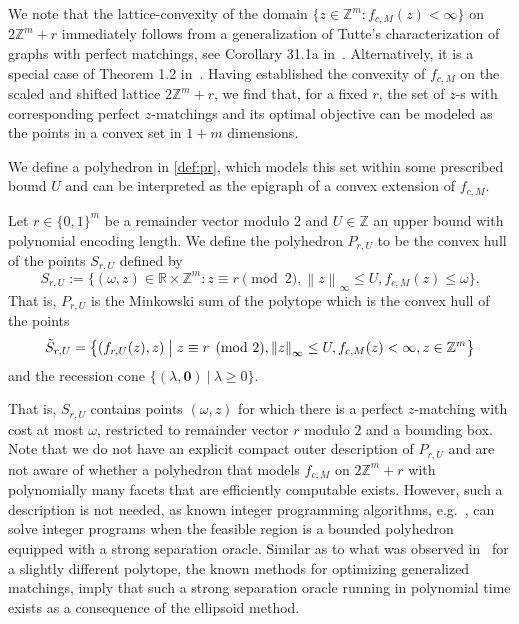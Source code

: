 \documentclass[a4paper,UKenglish,cleveref,thm-restate]{lipics-v2021}
\newcommand{\R}{\mathbb R}
\newcommand{\Z}{\mathbb Z}
\newcommand{\veczero}{\mathbf0}
\begin{document}
{We note that the lattice-convexity of the domain $\{z\in\Z^m\colon f_{c,M}(z)<\infty\}$ on $2\Z^m+r$ immediately follows from a generalization of Tutte's characterization of graphs with perfect matchings, see Corollary 31.1a in~\cite{schrijver2003combinatorial}. Alternatively, it is a special case of Theorem 1.2 in~\cite{DBLP:journals/jgt/AnsteeN99}. 
Having established the convexity of $f_{c,M}$ on the scaled and shifted lattice $2\Z^m+r$, we find that, for a fixed $r$, the set of $z$-s with corresponding perfect $z$-matchings and its optimal objective can be modeled as the points in a convex set in $1+m$ dimensions. 

}

We define a polyhedron in \cref{def:pr}, which models this set within some prescribed bound $U$ and can be interpreted as the epigraph of a convex extension of $f_{c,M}$.

\begin{definition}
    Let $r\in\{0,1\}^m$ be a remainder vector modulo $2$ and $U\in\Z$ an upper bound with polynomial encoding length. We define the polyhedron $P_{r,U}$ to be the convex hull of the points $S_{r,U}$ defined by
    \[
        S_{r,U}:=\bigl\{(\omega,z)\in\R\times\Z^m\colon z\equiv r\pmod2,\left\|z\right\|_\infty\le U,f_{c,M}(z)\le\omega\bigr\}.
    \]
    That is, $P_{r,U}$ is the Minkowski sum of the polytope which is the convex hull of the points
    \[
        \tilde S_{r,U}=\bigl\{(f_{r,U}(z),z)\bigm\vert z\equiv r\pmod2,\left\|z\right\|_\infty\le U,f_{c,M}(z)<\infty,z\in\Z^m\bigr\}
    \]
    and the recession cone $\{(\lambda,\veczero)\ \vert\ \lambda\ge0\}$.
    \label{def:pr}
\end{definition}

That is, $S_{r,U}$ contains points $(\omega,z)$ for which there is a perfect $z$-matching with cost at most $\omega$, restricted to remainder vector $r$ modulo $2$ and a bounding box. Note that we do not have an explicit compact outer description of $P_{r,U}$ and are not aware of whether a polyhedron that models $f_{c,M}$ on $2\Z^m+r$ with polynomially many facets that are efficiently computable exists. However, such a description is not needed, as known integer programming algorithms, e.g.~\cite{DBLP:conf/focs/ReisR23,DBLP:journals/mor/Lenstra83}, can solve integer programs when the feasible region is a bounded polyhedron equipped with a strong separation oracle. Similar as to what was observed in~\cite{DBLP:journals/mor/Zhang03} for a slightly different polytope, the known methods for optimizing generalized matchings, imply that such a strong separation oracle running in polynomial time exists as a consequence of the ellipsoid method.
\end{document}

